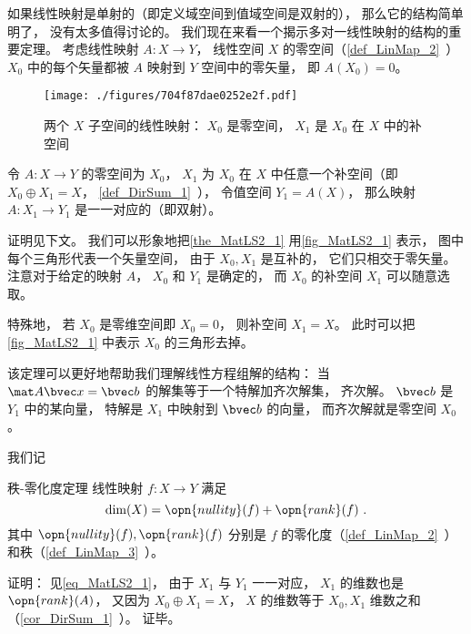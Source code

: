 
\begin{issues}
\issueTODO %
\end{issues}



如果线性映射是单射的（即定义域空间到值域空间是双射的）， 那么它的结构简单明了， 没有太多值得讨论的。 我们现在来看一个揭示多对一线性映射的结构的重要定理。 考虑线性映射 $A:X\to Y$， 线性空间 $X$ 的零空间（\autoref{def_LinMap_2}~）$X_0$ 中的每个矢量都被 $A$ 映射到 $Y$ 空间中的零矢量， 即 $A(X_0) = \qty{0}$。

\begin{figure}[ht]
\centering
\texttt{[image: ./figures/704f87dae0252e2f.pdf]}
\caption{两个 $X$ 子空间的线性映射： $X_0$ 是零空间， $X_1$ 是 $X_0$ 在 $X$ 中的补空间} \label{fig_MatLS2_1}
\end{figure}

\begin{theorem}{}\label{the_MatLS2_1}
令 $A:X \to Y$ 的零空间为 $X_0$， $X_1$ 为 $X_0$ 在 $X$ 中任意一个补空间（即 $X_0\oplus X_1 = X$， \autoref{def_DirSum_1}~）， 令值空间 $Y_1 = A(X)$， 那么映射 $A:X_1\to Y_1$ 是一一对应的（即双射）。
\end{theorem}
证明见下文。 我们可以形象地把\autoref{the_MatLS2_1} 用\autoref{fig_MatLS2_1} 表示， 图中每个三角形代表一个矢量空间， 由于 $X_0, X_1$ 是互补的， 它们只相交于零矢量。 注意对于给定的映射 $A$， $X_0$ 和 $Y_1$ 是确定的， 而 $X_0$ 的补空间 $X_1$ 可以随意选取。

特殊地， 若 $X_0$ 是零维空间即 $X_0 = \qty{0}$， 则补空间 $X_1 = X$。 此时可以把\autoref{fig_MatLS2_1} 中表示 $X_0$ 的三角形去掉。

该定理可以更好地帮助我们理解线性方程组解的结构： 当 $\mat A \bvec x = \bvec b$ 的解集等于一个特解加齐次解集， 齐次解。 $\bvec b$ 是 $Y_1$ 中的某向量， 特解是 $X_1$ 中映射到 $\bvec b$ 的向量， 而齐次解就是零空间 $X_0$。

我们记

\begin{corollary}{秩-零化度定理}\label{cor_MatLS2_1}
线性映射 $f: X \to Y$ 满足
\begin{equation}\label{eq_MatLS2_1}
\dim(X) = \opn{nullity}(f) + \opn{rank}(f)~.
\end{equation}
其中 $\opn{nullity}(f), \opn{rank}(f)$ 分别是 $f$ 的零化度（\autoref{def_LinMap_2}~）和秩（\autoref{def_LinMap_3}~）。
\end{corollary}
证明： 见\autoref{eq_MatLS2_1}， 由于 $X_1$ 与 $Y_1$ 一一对应， $X_1$ 的维数也是 $\opn{rank}(A)$， 又因为 $X_0\oplus X_1 = X$， $X$ 的维数等于 $X_0, X_1$ 维数之和（\autoref{cor_DirSum_1}~）。 证毕。

